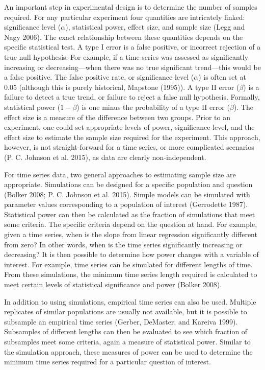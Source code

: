 \documentclass[12pt,]{article}
\begin{document}
An important step in experimental design is to determine the number of
samples required. For any particular experiment four quantities are
intricately linked: significance level (\(\alpha\)), statistical power,
effect size, and sample size (Legg and Nagy 2006). The exact
relationship between these quantities depends on the specific
statistical test. A type I error is a false positive, or incorrect
rejection of a true null hypothesis. For example, if a time series was
assessed as significantly increasing or decreasing---when there was no
true significant trend---this would be a false positive. The false
positive rate, or significance level (\(\alpha\)) is often set at 0.05
(although this is purely historical, Mapstone (1995)). A type II error
(\(\beta\)) is a failure to detect a true trend, or failure to reject a
false null hypothesis. Formally, statistical power (\(1-\beta\)) is one
minus the probability of a type II error (\(\beta\)). The effect size is
a measure of the difference between two groups. Prior to an experiment,
one could set appropriate levels of power, significance level, and the
effect size to estimate the sample size required for the experiment.
This approach, however, is not straight-forward for a time series, or
more complicated scenarios (P. C. Johnson et al. 2015), as data are
clearly non-independent.

For time series data, two general approaches to estimating sample size
are appropriate. Simulations can be designed for a specific population
and question (Bolker 2008; P. C. Johnson et al. 2015). Simple models can
be simulated with parameter values corresponding to a population of
interest (Gerrodette 1987). Statistical power can then be calculated as
the fraction of simulations that meet some criteria. The specific
criteria depend on the question at hand. For example, given a time
series, when is the slope from linear regression significantly different
from zero? In other words, when is the time series significantly
increasing or decreasing? It is then possible to determine how power
changes with a variable of interest. For example, time series can be
simulated for different lengths of time. From these simulations, the
minimum time series length required is calculated to meet certain levels
of statistical significance and power (Bolker 2008).

In addition to using simulations, empirical time series can also be
used. Multiple replicates of similar populations are usually not
available, but it is possible to subsample an empirical time series
(Gerber, DeMaster, and Kareiva 1999). Subsamples of different lengths
can then be evaluated to see which fraction of subsamples meet some
criteria, again a measure of statistical power. Similar to the
simulation approach, these measures of power can be used to determine
the minimum time series required for a particular question of interest.
\end{document}
